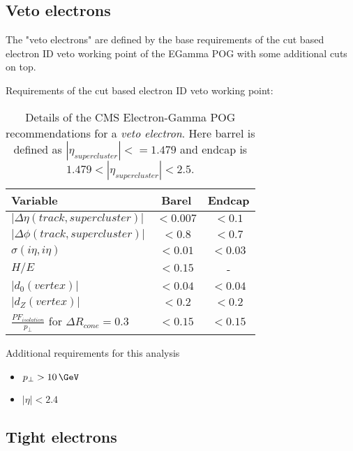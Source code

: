 \subsection{Veto electrons}

The "veto electrons" are defined by the base requirements of the cut based electron ID veto working point of the EGamma POG with some additional cuts on top. 
  
Requirements of the cut based electron ID veto working point:
 
\begin{table}[htp]
  
\begin{tabular}{|l|c|c|}
\hline
Variable & Barel & Endcap \\
\hline\hline
$| \Delta\eta(track,supercluster) |$ & $<0.007$ & $<0.1$  \\
$| \Delta\phi(track,supercluster) |$ & $<0.8  $ & $<0.7$  \\
$ \sigma(i\eta,i\eta)$               & $<0.01 $ & $<0.03$ \\
$H/E$                                & $<0.15 $ &       - \\
$|d_{0}(vertex)|$                    & $<0.04 $ & $<0.04$ \\
$|d_{Z}(vertex)|$                    & $<0.2  $ & $<0.2 $ \\
$\frac{PF_{isolation}}{p_{\perp}}$ for $ \Delta R_{cone}=0.3$  & $<0.15 $ & $<0.15$ \\
\hline
\end{tabular}
\caption{Details of the \gls{CMS} Electron-Gamma \gls{POG} recommendations for a \textit{veto electron}. Here barrel is defined as $ |\eta_{supercluster}|<=1.479 $ and endcap is $ 1.479 < |\eta_{supercluster}| < 2.5 $.} 
\end{table}

 
 
Additional requirements for this analysis
\begin{itemize}
  \item $ p_{\perp} > 10\,\GeV$
  \item $ |\eta| < 2.4 $
\end{itemize}
 
\subsection{Tight electrons}

